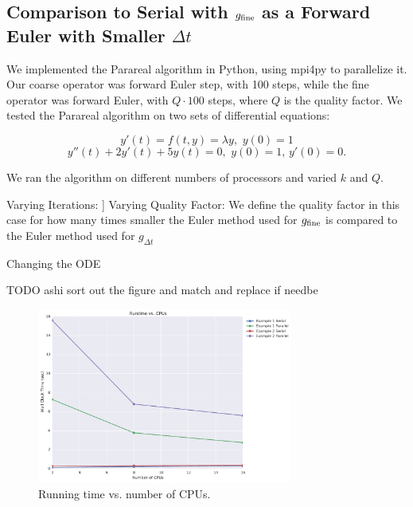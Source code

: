 \documentclass[letterpaper,12pt]{article}
\begin{document}
\subsection{Comparison to Serial with $g_{\textnormal{fine}}$ as a Forward Euler with
Smaller $\Delta t$}

We implemented the Parareal algorithm in Python, using mpi4py to parallelize it.
Our coarse operator was forward Euler step, with 100 steps, while the fine
operator was forward Euler, with $Q \cdot 100$ steps, where $Q$ is the quality
factor. We tested the Parareal algorithm on two sets of differential equations:

\[
y'(t) = f(t, y) = \lambda y, \, \, y(0) = 1
\]
\[
y''(t) + 2y'(t) + 5y(t) = 0, \, \, y(0) = 1, \, y'(0) = 0.
\]

We ran the algorithm on different numbers of processors and varied $k$ and $Q$. 

Varying Iterations:
]
Varying Quality Factor:
We define the quality factor in this case for how many times smaller the Euler method used for $g_{\textnormal{fine}}$ is compared to the Euler method used for $g_{\Delta t}$

Changing the ODE

TODO ashi sort out the figure and match and replace if needbe

\begin{figure}
\begin{center}
\includegraphics[width=0.75\textwidth]{data/runtime_vs_cpus.pdf}
\caption{Running time vs. number of CPUs.}
\label{fig:run_v_cpu}
\end{center}
\end{figure}
\end{document}
